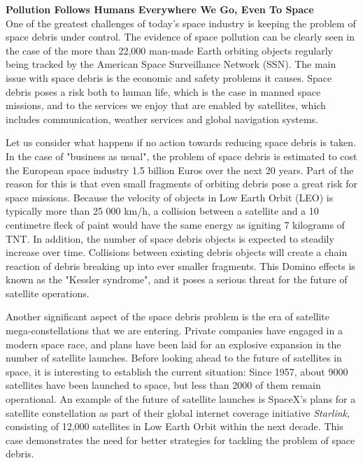 \documentclass[a4paper]{article}
\begin{document}
\textbf{Pollution Follows Humans Everywhere We Go, Even To Space} \\


One of the greatest challenges of today's space industry is keeping the problem of space debris under control. The evidence of space pollution can be clearly seen in the case of the more than 22,000 man-made Earth orbiting objects regularly being tracked by the American Space Surveillance Network (SSN)\cite{ESA_space_debris_figures}. The main issue with space debris is the economic and safety problems it causes. Space debris poses a risk both to human life, which is the case in manned space missions, and to the services we enjoy that are enabled by satellites, which includes communication, weather services and global navigation systems. 


Let us consider what happens if no action towards reducing space debris is taken. In the case of "business as usual", the problem of space debris is estimated to cost the European space industry 1.5 billion Euros over the next 20 years\cite{space_debris_cost}. Part of the reason for this is that even small fragments of orbiting debris pose a great risk for space missions. Because the velocity of objects in Low Earth Orbit (LEO) is typically more than 25 000 km/h, a collision between a satellite and a 10 centimetre fleck of paint would have the same energy as igniting 7 kilograms of TNT\cite{kessler_syndrome_bigthink}. In addition, the number of space debris objects is expected to steadily increase over time. Collisions between existing debris objects will create a chain reaction of debris breaking up into ever smaller fragments. This Domino effects is known as the "Kessler syndrome"\cite{kessler_syndrome}, and it poses a serious threat for the future of satellite operations.


Another significant aspect of the space debris problem is the era of satellite mega-constellations that we are entering. Private companies have engaged in a modern space race, and plans have been laid for an explosive expansion in the number of satellite launches. Before looking ahead to the future of satellites in space, it is interesting to establish the current situation: Since 1957, about 9000 satellites have been launched to space, but less than 2000 of them remain operational\cite{ESA_space_debris_figures}. An example of the future of satellite launches is SpaceX's plans for a satellite constellation as part of their global internet coverage initiative \textit{Starlink}, consisting of 12,000 satellites in Low Earth Orbit within the next decade\cite{ESA_constellation}. This case demonstrates the need for better strategies for tackling the problem of space debris.\\
\end{document}
